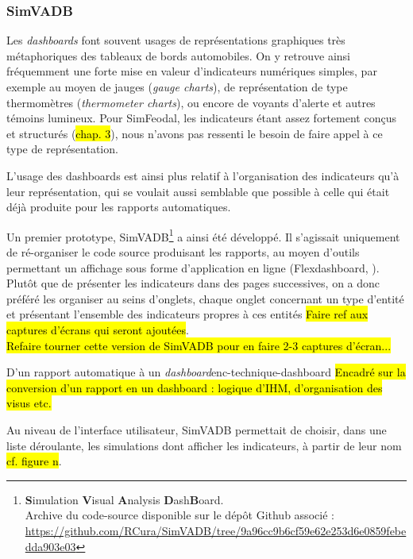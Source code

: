 	\subsubsection{SimVADB}\label{subsubsec:simvadb}

	Les \textit{dashboards} font souvent usages de représentations graphiques très métaphoriques des tableaux de bords automobiles.
	On y retrouve ainsi fréquemment une forte mise en valeur d'indicateurs numériques simples, par exemple au moyen de jauges (\textit{gauge charts}), de représentation de type thermomètres (\textit{thermometer charts}), ou encore de voyants d'alerte et autres témoins lumineux.
	Pour SimFeodal, les indicateurs étant assez fortement conçus et structurés (\hl{chap. 3}), nous n'avons pas ressenti le besoin de faire appel à ce type de représentation.

	L'usage des dashboards est ainsi plus relatif à l'organisation des indicateurs qu'à leur représentation, qui se voulait aussi semblable que possible à celle qui était déjà produite pour les rapports automatiques.

	Un premier prototype, SimVADB\footnote{
	\textbf{S}imulation \textbf{V}isual \textbf{A}nalysis \textbf{D}ash\textbf{B}oard.\\
	Archive du code-source disponible sur le dépôt Github associé :
	\url{https://github.com/RCura/SimVADB/tree/9a96cc9b6cf59e62e253d6e0859febedda903e03}
	} a ainsi été développé.
	Il s'agissait uniquement de ré-organiser le code source produisant les rapports, au moyen d'outils permettant un affichage sous forme d'application en ligne (Flexdashboard, \autocite{iannone_flexdashboard_2018}).
	Plutôt que de présenter les indicateurs dans des pages successives, on a donc préféré les organiser au seins d'onglets, chaque onglet concernant un type d'entité et présentant l'ensemble des indicateurs propres à ces entités \hl{Faire ref aux captures d'écrans qui seront ajoutées}.\\
	\hl{Refaire tourner cette version de SimVADB pour en faire 2-3 captures d'écran...}\\

	\begin{encadre}{D'un rapport automatique à un \textit{dashboard}}{enc-technique-dashboard}
		\hl{Encadré sur la conversion d'un rapport en un dashboard : logique d'IHM, d'organisation des visus etc.}
	\end{encadre}

	Au niveau de l'interface utilisateur, SimVADB permettait de choisir, dans une liste déroulante, les simulations dont afficher les indicateurs, à partir de leur nom \hl{cf. figure n}.

